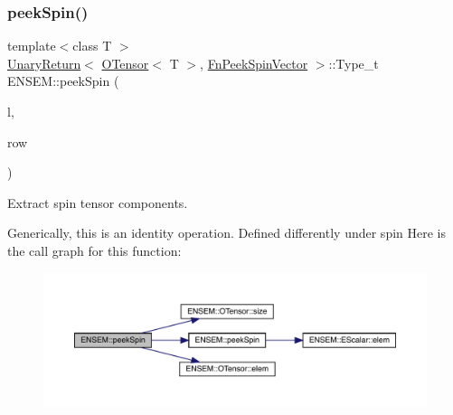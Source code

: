 \subsubsection{\texorpdfstring{peekSpin()}{peekSpin()}\hspace{0.1cm}{\footnotesize\ttfamily [1/2]}}
{\footnotesize\ttfamily template$<$class T $>$ \\
\mbox{\hyperlink{structENSEM_1_1UnaryReturn}{Unary\+Return}}$<$ \mbox{\hyperlink{classENSEM_1_1OTensor}{O\+Tensor}}$<$ T $>$, \mbox{\hyperlink{structENSEM_1_1FnPeekSpinVector}{Fn\+Peek\+Spin\+Vector}} $>$\+::Type\+\_\+t E\+N\+S\+E\+M\+::peek\+Spin (\begin{DoxyParamCaption}\item[{const \mbox{\hyperlink{classENSEM_1_1OTensor}{O\+Tensor}}$<$ T $>$ \&}]{l,  }\item[{int}]{row }\end{DoxyParamCaption})\hspace{0.3cm}{\ttfamily [inline]}}



Extract spin tensor components. 

Generically, this is an identity operation. Defined differently under spin Here is the call graph for this function\+:\nopagebreak
\begin{figure}[H]
\begin{center}
\leavevmode
\includegraphics[width=350pt]{de/d87/group__obstensor_gaeee51a2a721122db062ffe8a3e0192c3_cgraph}
\end{center}
\end{figure}
\mbox{\label{group__obstensor_ga7cb1fd7617714b490522aee26dd999be}} 
